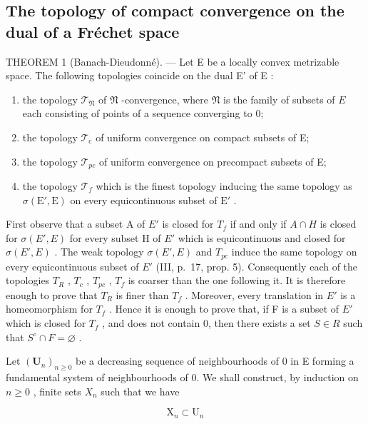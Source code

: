 \subsection{The topology of compact convergence on the dual of a Fréchet space}

THEOREM 1 (Banach-Dieudonné). --- Let E be a locally convex metrizable space. The following topologies coincide on the dual E' of E :

\begin{enumerate}
\def\labelenumi{\alph{enumi})}
\item
  the topology \(\mathcal{T}_{\mathfrak{N}}\) of \(\mathfrak{N}\) -convergence, where \(\mathfrak{N}\) is the family of subsets of \(E\) each consisting of points of a sequence converging to 0;
\item
  the topology \(\mathcal{T}_{\mathrm{c}}\) of uniform convergence on compact subsets of E;
\item
  the topology \(\mathcal{T}_{pc}\) of uniform convergence on precompact subsets of E;
\item
  the topology \(\mathcal{T}_f\) which is the finest topology inducing the same topology as \(\sigma(\mathrm{E}',\mathrm{E})\) on every equicontinuous subset of \(\mathrm{E}'\) .
\end{enumerate}

First observe that a subset A of \(E'\) is closed for \(T_{f}\) if and only if \(A \cap H\) is closed for \(\sigma(E', E)\) for every subset H of \(E'\) which is equicontinuous and closed for \(\sigma(E', E)\) . The weak topology \(\sigma(E', E)\) and \(T_{pc}\) induce the same topology on every equicontinuous subset of \(E'\) (III, p.~17, prop. 5). Consequently each of the topologies \(T_{R}\) , \(T_{c}\) , \(T_{pc}\) , \(T_{f}\) is coarser than the one following it. It is therefore enough to prove that \(T_{R}\) is finer than \(T_{f}\) . Moreover, every translation in \(E'\) is a homeomorphism for \(T_{f}\) . Hence it is enough to prove that, if F is a subset of \(E'\) which is closed for \(T_{f}\) , and does not contain 0, then there exists a set \(S \in R\) such that \(S^{\circ} \cap F = \varnothing\) .

Let \((\mathbf{U}_{n})_{n\geqslant0}\) be a decreasing sequence of neighbourhoods of 0 in E forming a fundamental system of neighbourhoods of 0. We shall construct, by induction on \(n\geqslant0\) , finite sets \(X_{n}\) such that we have

\[
\mathrm{X} _ {n} \subset \mathrm{U} _ {n}\tag{4}
\]

